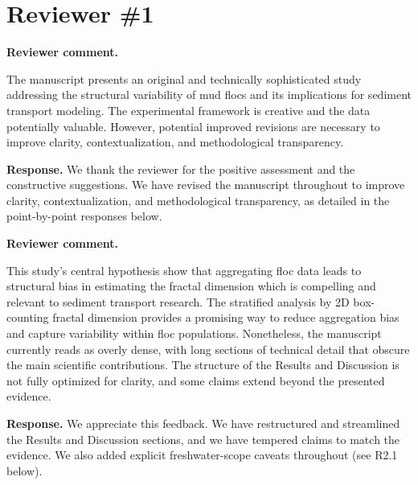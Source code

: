 \documentclass[11pt]{article}
\newenvironment{Snippet}{%
  \par\vspace{0.3em}\begin{list}{}{\setlength{\leftmargin}{1em}\setlength{\rightmargin}{0.5em}}\item\small\itshape
}{%
  \end{list}\vspace{0.3em}
}
\begin{document}
\section*{Reviewer \#1}
\begin{enumerate}[label=\textbf{R1.\arabic*.}]

\item \textbf{Reviewer comment.}
\begin{Snippet}
The manuscript presents an original and technically sophisticated study addressing the structural variability of mud flocs and its implications for sediment transport modeling. The experimental framework is creative and the data potentially valuable. However, potential improved revisions are necessary to improve clarity, contextualization, and methodological transparency.
\end{Snippet}
\textbf{Response.} We thank the reviewer for the positive assessment and the constructive suggestions. We have revised the manuscript throughout to improve clarity, contextualization, and methodological transparency, as detailed in the point-by-point responses below.

\item \textbf{Reviewer comment.}
\begin{Snippet}
This study’s central hypothesis show that aggregating floc data leads to structural bias in estimating the fractal dimension which is compelling and relevant to sediment transport research. The stratified analysis by 2D box-counting fractal dimension provides a promising way to reduce aggregation bias and capture variability within floc populations. Nonetheless, the manuscript currently reads as overly dense, with long sections of technical detail that obscure the main scientific contributions. The structure of the Results and Discussion is not fully optimized for clarity, and some claims extend beyond the presented evidence.
\end{Snippet}
\textbf{Response.} We appreciate this feedback. We have restructured and streamlined the Results and Discussion sections, and we have tempered claims to match the evidence. We also added explicit freshwater-scope caveats throughout (see R2.1 below).


\end{enumerate}
\end{document}
